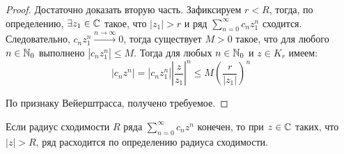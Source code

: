 \begin{proof}
	Достаточно доказать вторую часть. Зафиксируем $r < R$, тогда, по определению, $\exists z_1 \in \mathbb{C}$ такое, что $|z_1| > r$ и ряд $\sum_{n=0}^\infty c_nz_1^n$ сходится. Следовательно, $c_nz_1^n \xrightarrow{n \to \infty} 0$, тогда существует $M > 0$ такое, что для любого $n \in \mathbb{N}_0$ выполнено $|c_nz_1^n| \le M$. Тогда для любых $n \in \mathbb{N}_0$ и $z \in K_r$ имеем:
	\[|c_nz^n| = \left|c_nz_1^n\right|\left|\frac{z}{z_1}\right|^n \le M\left(\frac{r}{|z_1|}\right)^n\]
	
	По признаку Вейерштрасса, получено требуемое.
\end{proof}

\begin{note}
	Если радиус сходимости $R$ ряда $\sum_{n=0}^\infty c_nz^n$ конечен, то при $z \in \mathbb{C}$ таких, что $|z| > R$, ряд расходится по определению радиуса сходимости.
\end{note}